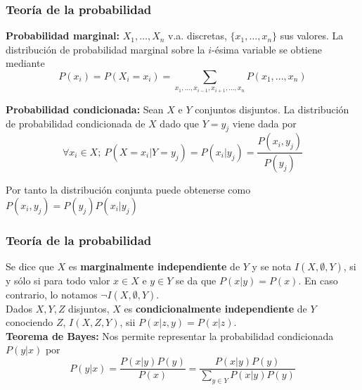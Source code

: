 \documentclass[leqno]{beamer}
\begin{document}

\begin{frame}
\frametitle{Teoría de la probabilidad}

\textbf{Probabilidad marginal:} $X_1, \dots, X_n$ v.a. discretas, $\{x_1,\dots,x_n\}$ sus valores. La distribución de probabilidad marginal sobre la $i$-ésima variable se obtiene mediante
	\[	P(x_i) = P(X_i=x_i) = 
	\sum_{x_1,...,x_{i-1},x_{i+1},...,x_n}P(x_1,...,x_n)	\]
	
\textbf{Probabilidad condicionada:}  Sean $X$ e $Y$ conjuntos disjuntos. La distribución de probabilidad condicionada de $X$ dado que $Y=y_j$ viene dada por
	\[ \forall x_i \in X;\ P(X=x_i | Y = y_j) = P(x_i|y_j) = 
	\frac{P(x_i,y_j)}{P(y_j)}\]

Por tanto la distribución conjunta puede obtenerse como $P(x_i,y_j) = P(y_j)P(x_i|y_j)$

\end{frame}

\begin{frame}
\frametitle{Teoría de la probabilidad}

Se dice que $X$ es \textbf{marginalmente independiente} de $Y$ y se nota $I(X,\emptyset,Y)$, si y sólo si para todo valor $x \in X$ e $y \in Y$ se da que $P(x|y)=P(x)$. En caso contrario, lo notamos $\neg I(X,\emptyset,Y)$.\\

Dados $X,Y,Z$ disjuntos, $X$ es \textbf{condicionalmente independiente} de $Y$ conociendo $Z$, $I(X,Z,Y)$, sii $P(x|z,y)= P(x|z)$.\\

\textbf{Teorema de Bayes:} Nos permite representar la probabilidad condicionada $P(y|x)$ por 
\[P(y|x) = \frac{P(x|y)P(y)}{P(x)} = \frac{P(x|y)P(y)}{\sum\limits_{y\in Y} P(x|y)P(y)}\]
\end{frame}
\end{document}
